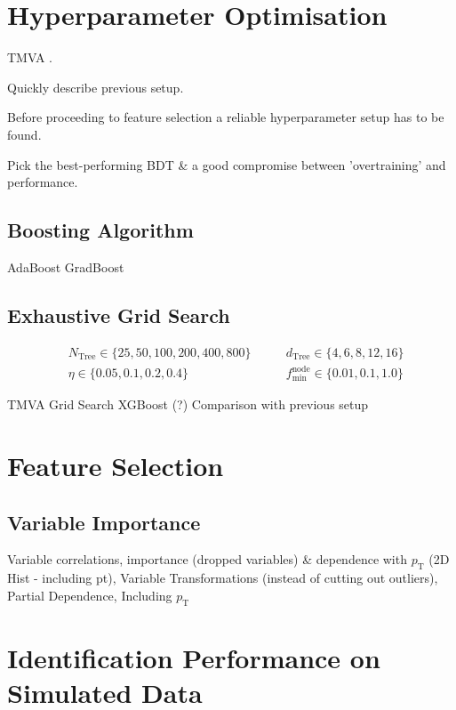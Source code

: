 \section{Hyperparameter Optimisation}
\label{sec:bdt_hyperparam}

TMVA \cite{tmva}.

Quickly describe previous setup.

Before proceeding to feature selection a reliable hyperparameter setup has to be
found.

Pick the best-performing BDT \& a good compromise between 'overtraining' and
performance.

\subsection{Boosting Algorithm}
\label{sec:bdt_boosting}

AdaBoost \textrightarrow GradBoost

\subsection{Exhaustive Grid Search}
\label{sec:bdt_grid_search}

\begin{align*}
  &N_\mathrm{Tree} \in \{25, 50, 100, 200, 400, 800\} \qquad
  &d_\mathrm{Tree} \in \{4, 6, 8, 12, 16\} \\
  &\eta \in \{0.05, 0.1, 0.2, 0.4\} \qquad
  &f_\mathrm{min}^\mathrm{node} \in \{0.01, 0.1, 1.0\}
\end{align*}

TMVA Grid Search
XGBoost (?)
Comparison with previous setup

\section{Feature Selection}
\label{sec:bdt_feature_selection}

\subsection{Variable Importance}
\label{sec:bdt_var_importance}

Variable correlations, importance (dropped variables) \& dependence with
$p_\mathrm{T}$ (2D Hist - including pt), Variable Transformations (instead
of cutting out outliers), Partial Dependence, Including $p_\mathrm{T}$

\section{Identification Performance on Simulated Data}
\label{sec:bdt_perf}

